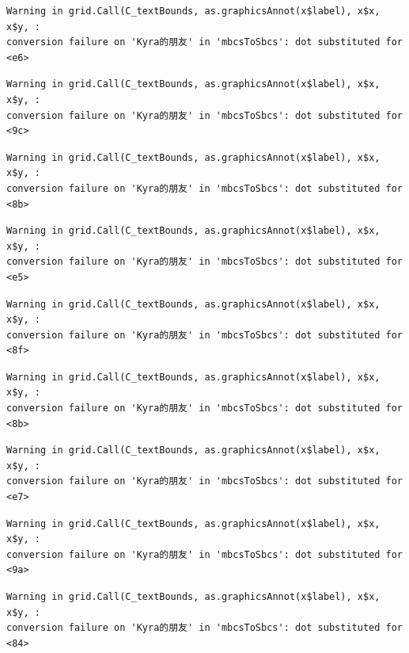 \documentclass[
  letterpaper,
  DIV=11,
  numbers=noendperiod]{scrreprt}
\begin{document}
\begin{verbatim}
Warning in grid.Call(C_textBounds, as.graphicsAnnot(x$label), x$x, x$y, :
conversion failure on 'Kyra的朋友' in 'mbcsToSbcs': dot substituted for <e6>
\end{verbatim}

\begin{verbatim}
Warning in grid.Call(C_textBounds, as.graphicsAnnot(x$label), x$x, x$y, :
conversion failure on 'Kyra的朋友' in 'mbcsToSbcs': dot substituted for <9c>
\end{verbatim}

\begin{verbatim}
Warning in grid.Call(C_textBounds, as.graphicsAnnot(x$label), x$x, x$y, :
conversion failure on 'Kyra的朋友' in 'mbcsToSbcs': dot substituted for <8b>
\end{verbatim}

\begin{verbatim}
Warning in grid.Call(C_textBounds, as.graphicsAnnot(x$label), x$x, x$y, :
conversion failure on 'Kyra的朋友' in 'mbcsToSbcs': dot substituted for <e5>
\end{verbatim}

\begin{verbatim}
Warning in grid.Call(C_textBounds, as.graphicsAnnot(x$label), x$x, x$y, :
conversion failure on 'Kyra的朋友' in 'mbcsToSbcs': dot substituted for <8f>
\end{verbatim}

\begin{verbatim}
Warning in grid.Call(C_textBounds, as.graphicsAnnot(x$label), x$x, x$y, :
conversion failure on 'Kyra的朋友' in 'mbcsToSbcs': dot substituted for <8b>
\end{verbatim}

\begin{verbatim}
Warning in grid.Call(C_textBounds, as.graphicsAnnot(x$label), x$x, x$y, :
conversion failure on 'Kyra的朋友' in 'mbcsToSbcs': dot substituted for <e7>
\end{verbatim}

\begin{verbatim}
Warning in grid.Call(C_textBounds, as.graphicsAnnot(x$label), x$x, x$y, :
conversion failure on 'Kyra的朋友' in 'mbcsToSbcs': dot substituted for <9a>
\end{verbatim}

\begin{verbatim}
Warning in grid.Call(C_textBounds, as.graphicsAnnot(x$label), x$x, x$y, :
conversion failure on 'Kyra的朋友' in 'mbcsToSbcs': dot substituted for <84>
\end{verbatim}
\end{document}
